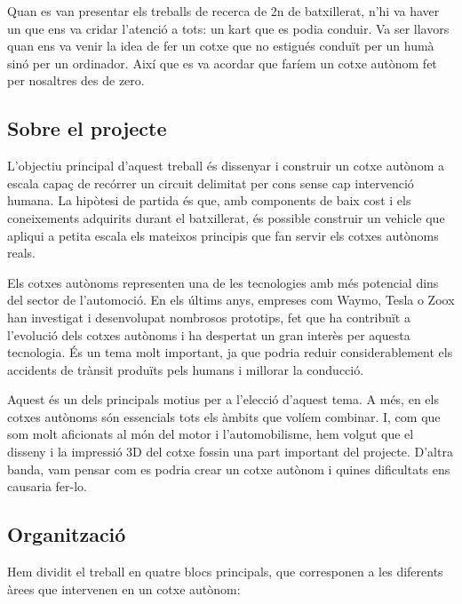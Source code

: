 \documentclass[11pt,a4paper]{article}
\begin{document}
Quan es van presentar els treballs de recerca de 2n de batxillerat, n’hi va haver un que ens va cridar l’atenció a tots: un kart que es podia conduir. Va ser llavors quan ens va venir la idea de fer un cotxe que no estigués conduït per un humà sinó per un ordinador. Així que es va acordar que faríem un cotxe autònom fet per nosaltres des de zero.

\subsection{Sobre el projecte}

L’objectiu principal d’aquest treball és dissenyar i construir un cotxe autònom a escala capaç de recórrer un circuit delimitat per cons sense cap intervenció humana. La hipòtesi de partida és que, amb components de baix cost i els coneixements adquirits durant el batxillerat, és possible construir un vehicle que apliqui a petita escala els mateixos principis que fan servir els cotxes autònoms reals.

Els cotxes autònoms representen una de les tecnologies amb més potencial dins del sector de l'automoció. En els últims anys, empreses com Waymo, Tesla o Zoox han investigat i desenvolupat nombrosos prototips, fet que ha contribuït a l’evolució dels cotxes autònoms i ha despertat un gran interès per aquesta tecnologia. És un tema molt important, ja que podria reduir considerablement els accidents de trànsit produïts pels humans i millorar la conducció.

Aquest és un dels principals motius per a l’elecció d’aquest tema. A més, en els cotxes autònoms són essencials tots els àmbits que volíem combinar. I, com que som molt aficionats al món del motor i l’automobilisme, hem volgut que el disseny i la impressió 3D del cotxe fossin una part important del projecte. D’altra banda, vam pensar com es podria crear un cotxe autònom i quines dificultats ens causaria fer-lo.

\subsection{Organització}

Hem dividit el treball en quatre blocs principals, que corresponen a les diferents àrees que intervenen en un cotxe autònom:
\nopagebreak
\end{document}
